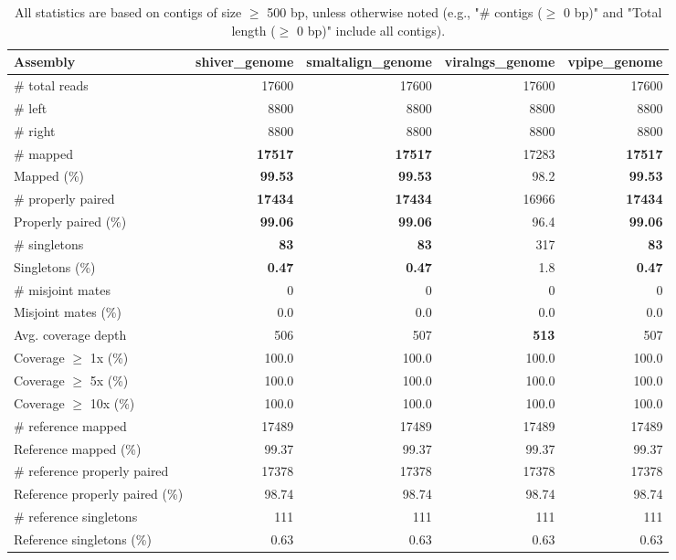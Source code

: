 \documentclass[12pt,a4paper]{article}
\begin{document}
\begin{table}[ht]
\begin{center}
\caption{All statistics are based on contigs of size $\geq$ 500 bp, unless otherwise noted (e.g., "\# contigs ($\geq$ 0 bp)" and "Total length ($\geq$ 0 bp)" include all contigs).}
\begin{tabular}{|l*{4}{|r}|}
\hline
Assembly & shiver\_genome & smaltalign\_genome & viralngs\_genome & vpipe\_genome \\ \hline
\# total reads & 17600 & 17600 & 17600 & 17600 \\ \hline
\# left & 8800 & 8800 & 8800 & 8800 \\ \hline
\# right & 8800 & 8800 & 8800 & 8800 \\ \hline
\# mapped & {\bf 17517} & {\bf 17517} & 17283 & {\bf 17517} \\ \hline
Mapped (\%) & {\bf 99.53} & {\bf 99.53} & 98.2 & {\bf 99.53} \\ \hline
\# properly paired & {\bf 17434} & {\bf 17434} & 16966 & {\bf 17434} \\ \hline
Properly paired (\%) & {\bf 99.06} & {\bf 99.06} & 96.4 & {\bf 99.06} \\ \hline
\# singletons & {\bf 83} & {\bf 83} & 317 & {\bf 83} \\ \hline
Singletons (\%) & {\bf 0.47} & {\bf 0.47} & 1.8 & {\bf 0.47} \\ \hline
\# misjoint mates & 0 & 0 & 0 & 0 \\ \hline
Misjoint mates (\%) & 0.0 & 0.0 & 0.0 & 0.0 \\ \hline
Avg. coverage depth & 506 & 507 & {\bf 513} & 507 \\ \hline
Coverage $\geq$ 1x (\%) & 100.0 & 100.0 & 100.0 & 100.0 \\ \hline
Coverage $\geq$ 5x (\%) & 100.0 & 100.0 & 100.0 & 100.0 \\ \hline
Coverage $\geq$ 10x (\%) & 100.0 & 100.0 & 100.0 & 100.0 \\ \hline
\# reference mapped & 17489 & 17489 & 17489 & 17489 \\ \hline
Reference mapped (\%) & 99.37 & 99.37 & 99.37 & 99.37 \\ \hline
\# reference properly paired & 17378 & 17378 & 17378 & 17378 \\ \hline
Reference properly paired (\%) & 98.74 & 98.74 & 98.74 & 98.74 \\ \hline
\# reference singletons & 111 & 111 & 111 & 111 \\ \hline
Reference singletons (\%) & 0.63 & 0.63 & 0.63 & 0.63 \\ \hline

\end{tabular}
\end{center}
\end{table}
\end{document}
